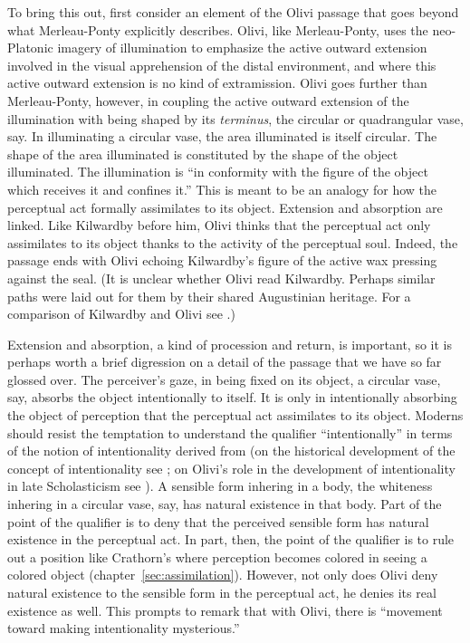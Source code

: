 To bring this out, first consider an element of the Olivi passage that goes beyond what Merleau-Ponty explicitly describes. Olivi, like Merleau-Ponty, uses the neo-Platonic imagery of illumination to emphasize the active outward extension involved in the visual apprehension of the distal environment, and where this active outward extension is no kind of extramission. Olivi goes further than Merleau-Ponty, however, in coupling the active outward extension of the illumination with being shaped by its \emph{terminus}, the circular or quadrangular vase, say. In illuminating a circular vase, the area illuminated is itself circular. The shape of the area illuminated is constituted by the shape of the object illuminated. The illumination is ``in conformity with the figure of the object which receives it and confines it.'' This is meant to be an analogy for how the perceptual act formally assimilates to its object. Extension and absorption are linked. Like Kilwardby before him, Olivi thinks that the perceptual act only assimilates to its object thanks to the activity of the perceptual soul. Indeed, the passage ends with Olivi echoing Kilwardby's figure of the active wax pressing against the seal. (It is unclear whether Olivi read Kilwardby. Perhaps similar paths were laid out for them by their shared Augustinian heritage. For a comparison of Kilwardby and Olivi see \citealt{Silva:2014cl}.)

Extension and absorption, a kind of procession and return, is important, so it is perhaps worth a brief digression on a detail of the passage that we have so far glossed over. The perceiver's gaze, in being fixed on its object, a circular vase, say, absorbs the object intentionally to itself. It is only in intentionally absorbing the object of perception that the perceptual act assimilates to its object. Moderns should resist the temptation to understand the qualifier ``intentionally'' in terms of the notion of intentionality derived from \citet{Brentano:1874aa} (on the historical development of the concept of intentionality see \citealt{Sorabji:2003fk}; on Olivi's role in the development of intentionality in late Scholasticism see \citealt[chapter 2]{Pasnau:1997aa}). A sensible form inhering in a body, the whiteness inhering in a circular vase, say, has natural existence in that body. Part of the point of the qualifier is to deny that the perceived sensible form has natural existence in the perceptual act. In part, then, the point of the qualifier is to rule out a position like Crathorn's where perception becomes colored in seeing a colored object (chapter~\ref{sec:assimilation}). However, not only does Olivi deny natural existence to the sensible form in the perceptual act, he denies its real existence as well. This prompts \citet[67]{Pasnau:1997aa} to remark that with Olivi, there is ``movement toward making intentionality mysterious.''

